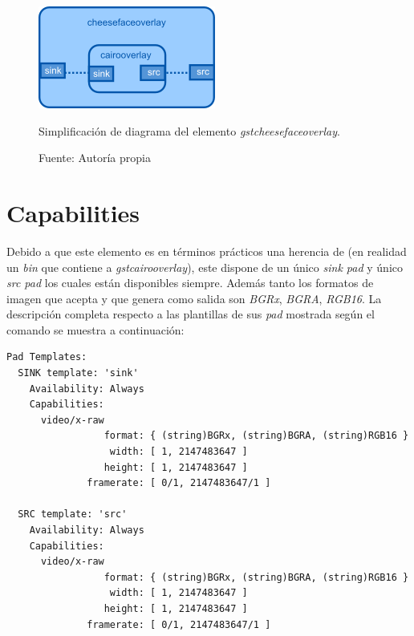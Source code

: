 \documentclass[a4paper,openright,12pt]{report}
\begin{document}
\begin{figure}[!h]
  \centering
    \includegraphics{../images/cheesefaceoverlay-design.png}\par
  \caption{Simplificación de diagrama del elemento \textit{gstcheesefaceoverlay}.}
    \label{fig:cheesefaceoverlay-design}
  \caption*{Fuente: Autoría propia}
\end{figure}

\section{Capabilities}
Debido a que este elemento es en términos prácticos una herencia de (en realidad
un \textit{bin} que contiene a \textit{gstcairooverlay}), este dispone de
un único \textit{sink pad} y único \textit{src pad} los cuales están disponibles
siempre. Además tanto los formatos de imagen que acepta y que genera como salida
son \textit{BGRx}, \textit{BGRA}, \textit{RGB16}. La descripción completa
respecto a las plantillas de sus \textit{pad} mostrada según el comando
 se muestra a continuación:

\begin{verbatim}
Pad Templates:
  SINK template: 'sink'
    Availability: Always
    Capabilities:
      video/x-raw
                 format: { (string)BGRx, (string)BGRA, (string)RGB16 }
                  width: [ 1, 2147483647 ]
                 height: [ 1, 2147483647 ]
              framerate: [ 0/1, 2147483647/1 ]
  
  SRC template: 'src'
    Availability: Always
    Capabilities:
      video/x-raw
                 format: { (string)BGRx, (string)BGRA, (string)RGB16 }
                  width: [ 1, 2147483647 ]
                 height: [ 1, 2147483647 ]
              framerate: [ 0/1, 2147483647/1 ]
\end{verbatim}
\end{document}
